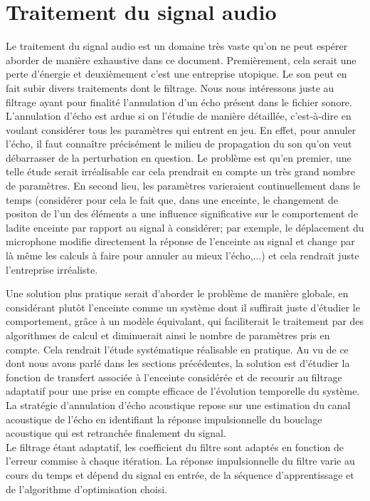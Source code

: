 \section{Traitement du signal audio}
Le traitement du signal audio est un domaine très vaste qu'on ne peut espérer aborder de manière exhaustive dans ce document. Premièrement, cela serait une perte d'énergie et deuxièmement c'est une entreprise utopique. Le son peut en fait subir divers traitements dont le filtrage. Nous nous intéressons juste au filtrage ayant pour finalité l'annulation d'un écho présent dans le fichier sonore.\\
L'annulation d'écho est ardue si on l'étudie de manière détaillée, c'est-à-dire en voulant considérer tous les paramètres qui entrent en jeu. En effet, pour annuler l'écho, il faut connaître précisément le milieu de propagation du son qu'on veut débarrasser de la perturbation en question. Le problème est qu'en premier, une telle étude serait irréalisable car cela prendrait en compte un très grand nombre de paramètres. En second lieu, les paramètres varieraient continuellement dans le temps (considérer pour cela le fait que, dans une enceinte, le changement de positon de l'un des éléments a une influence significative sur le comportement de ladite enceinte par rapport au signal à considérer; par exemple, le déplacement du microphone modifie directement la réponse de l'enceinte au signal et change par là même les calculs à faire pour annuler au mieux l'écho,...) et cela rendrait juste l'entreprise irréaliste.

Une solution plus pratique serait d'aborder le problème de manière globale, en considérant plutôt l'enceinte comme un système dont il suffirait juste d'étudier le comportement, grâce à un modèle équivalant, qui faciliterait le traitement par des algorithmes de calcul et diminuerait ainsi le nombre de paramètres pris en compte. Cela rendrait l'étude systématique réalisable en pratique. Au vu de ce dont nous avons parlé dans les sections précédentes, la solution est d'étudier la fonction de transfert associée à l'enceinte considérée et de recourir au filtrage adaptatif pour une prise en compte efficace de l'évolution temporelle du système. La stratégie d'annulation d'écho acoustique repose sur une estimation du canal acoustique de l'écho en identifiant la réponse impulsionnelle du bouclage acoustique qui est retranchée finalement du signal.\\
Le filtrage étant adaptatif, les coefficient du filtre sont adaptés en fonction de l'erreur commise à chaque itération. La réponse impulsionnelle du filtre varie au cours du temps et dépend du signal en entrée, de la séquence d'apprentissage et de l'algorithme d'optimisation choisi\cite{ThAlaedine}.
